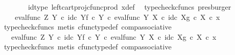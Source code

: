 \begin{isabellebody}
\ \ \ \ \ \ \isamarkupfalse%
\ id{\isacharunderscore}{\kern0pt}type\ left{\isacharunderscore}{\kern0pt}cart{\isacharunderscore}{\kern0pt}proj{\isacharunderscore}{\kern0pt}cfunc{\isacharunderscore}{\kern0pt}prod\ x{\isacharunderscore}{\kern0pt}def\ \isamarkupfalse%
\ {\isacharparenleft}{\kern0pt}typecheck{\isacharunderscore}{\kern0pt}cfuncs{\isacharcomma}{\kern0pt}\ presburger{\isacharparenright}{\kern0pt}\isanewline
\ \ \ \ \isamarkupfalse%
\ \isamarkupfalse%
\ {\isachardoublequoteopen}{\isachardot}{\kern0pt}{\isachardot}{\kern0pt}{\isachardot}{\kern0pt}\ {\isacharequal}{\kern0pt}\ \ {\isacharparenleft}{\kern0pt}eval{\isacharunderscore}{\kern0pt}func\ Z\ Y\ {\isasymcirc}\isactrlsub c\ {\isasymlangle}id\isactrlsub c\ Y{\isacharcomma}{\kern0pt}f\ {\isasymcirc}\isactrlsub c\ {\isasymbeta}\isactrlbsub Y\isactrlesub {\isasymrangle}{\isacharparenright}{\kern0pt}\ {\isasymcirc}\isactrlsub c\ eval{\isacharunderscore}{\kern0pt}func\ Y\ X\ {\isasymcirc}\isactrlsub c\ {\isasymlangle}id\isactrlsub c\ X{\isacharcomma}{\kern0pt}g\ {\isasymcirc}\isactrlsub c\ {\isasymbeta}\isactrlbsub X\isactrlesub {\isasymrangle}\ {\isasymcirc}\isactrlsub c\ x{\isachardoublequoteclose}\isanewline
\ \ \ \ \ \ \isamarkupfalse%
\ {\isacharparenleft}{\kern0pt}typecheck{\isacharunderscore}{\kern0pt}cfuncs{\isacharcomma}{\kern0pt}\ metis\ cfunc{\isacharunderscore}{\kern0pt}type{\isacharunderscore}{\kern0pt}def\ comp{\isacharunderscore}{\kern0pt}associative{\isacharparenright}{\kern0pt}\isanewline
\ \ \ \ \isamarkupfalse%
\ \isamarkupfalse%
\ {\isachardoublequoteopen}{\isachardot}{\kern0pt}{\isachardot}{\kern0pt}{\isachardot}{\kern0pt}\ {\isacharequal}{\kern0pt}\ eval{\isacharunderscore}{\kern0pt}func\ Z\ Y\ {\isasymcirc}\isactrlsub c\ {\isasymlangle}id\isactrlsub c\ Y{\isacharcomma}{\kern0pt}f\ {\isasymcirc}\isactrlsub c\ {\isasymbeta}\isactrlbsub Y\isactrlesub {\isasymrangle}\ {\isasymcirc}\isactrlsub c\ eval{\isacharunderscore}{\kern0pt}func\ Y\ X\ {\isasymcirc}\isactrlsub c\ {\isasymlangle}id\isactrlsub c\ X{\isacharcomma}{\kern0pt}g\ {\isasymcirc}\isactrlsub c\ {\isasymbeta}\isactrlbsub X\isactrlesub {\isasymrangle}\ {\isasymcirc}\isactrlsub c\ x{\isachardoublequoteclose}\isanewline
\ \ \ \ \ \ \isamarkupfalse%
\ {\isacharparenleft}{\kern0pt}typecheck{\isacharunderscore}{\kern0pt}cfuncs{\isacharcomma}{\kern0pt}\ metis\ cfunc{\isacharunderscore}{\kern0pt}type{\isacharunderscore}{\kern0pt}def\ comp{\isacharunderscore}{\kern0pt}associative{\isacharparenright}{\kern0pt}\isanewline

\end{isabellebody}
